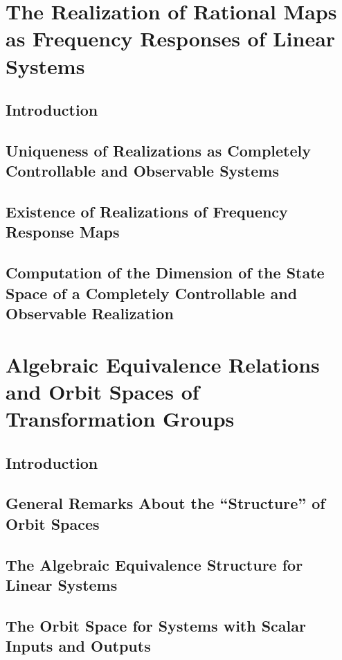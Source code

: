 \documentclass[12pt]{book}
\theoremstyle{plain}
\theoremstyle{definition}
\begin{document}
\chapter{The Realization of Rational Maps as Frequency Responses of Linear Systems}

\section{Introduction}

\section{Uniqueness of Realizations as Completely Controllable and Observable Systems}

\section{Existence of Realizations of Frequency Response Maps}

\section{Computation of the Dimension of the State Space of a Completely Controllable and Observable Realization}

\chapter{Algebraic Equivalence Relations and Orbit Spaces of Transformation Groups}

\section{Introduction}

\section{General Remarks About the ``Structure'' of Orbit Spaces}

\section{The Algebraic Equivalence Structure for Linear Systems}

\section{The Orbit Space for Systems with Scalar Inputs and Outputs}

\end{document}
